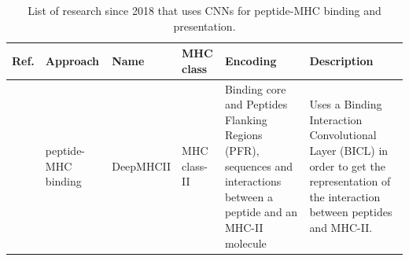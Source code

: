 \begin{table}[]
	\caption{List of research since 2018 that uses CNNs for peptide-MHC binding and presentation.}
	\label{tab:cnn1}
	\setlength{\tabcolsep}{0.5em} %
	{\renewcommand{\arraystretch}{1.2}%
		
		\begin{tabular}{p{1.3cm}p{1.6cm}p{2cm}p{1.6cm}p{1.9cm}p{4cm}}
			\textbf{Ref.}                              & \textbf{Approach}        & \textbf{Name} & \textbf{MHC class} & \textbf{Encoding}                                   & \textbf{Description}                                                                                                                                                                                  \\ \hline
			
				\cite{you2022deepmhcii}	& peptide-MHC binding &	DeepMHCII &	MHC class-II &	Binding core and Peptides Flanking Regions (PFR), sequences and interactions between a peptide and an MHC-II molecule	& Uses a Binding Interaction Convolutional Layer (BICL) in order to get the representation of the interaction between peptides and MHC-II. \\
			

\end{tabular}}
\end{table}
